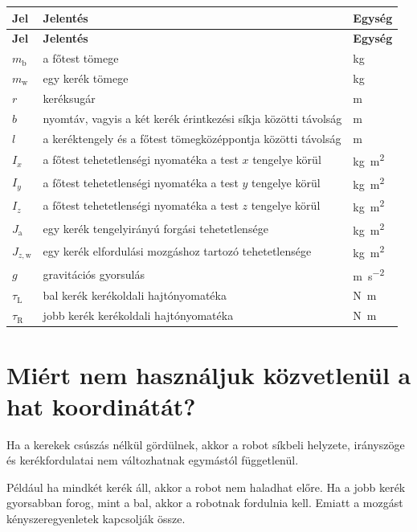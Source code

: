\documentclass[12pt,a4paper]{article}
\newcommand{\mbody}{m_{\mathrm{b}}}
\newcommand{\mwheel}{m_{\mathrm{w}}}
\newcommand{\Jspin}{J_{\mathrm{a}}}
\newcommand{\Jzw}{J_{z,\mathrm{w}}}
\newcommand{\tauL}{\tau_{\mathrm{L}}}
\newcommand{\tauR}{\tau_{\mathrm{R}}}
\begin{document}
	\begin{longtable}{>{\centering\arraybackslash}p{2.5cm} p{8cm} p{2.5cm}}
		\toprule
		\textbf{Jel} & \textbf{Jelentés} & \textbf{Egység} \\
		\midrule
		\endfirsthead
		\toprule
		\textbf{Jel} & \textbf{Jelentés} & \textbf{Egység} \\
		\midrule
		\endhead
		$\mbody$ & a főtest tömege & \si{kg} \\
		$\mwheel$ & egy kerék tömege & \si{kg} \\
		$r$ & keréksugár & \si{m} \\
		$b$ & nyomtáv, vagyis a két kerék érintkezési síkja közötti távolság & \si{m} \\
		$l$ & a keréktengely és a főtest tömegközéppontja közötti távolság & \si{m} \\
		$I_x$ & a főtest tehetetlenségi nyomatéka a test $x$ tengelye körül & \si{kg.m^2} \\
		$I_y$ & a főtest tehetetlenségi nyomatéka a test $y$ tengelye körül & \si{kg.m^2} \\
		$I_z$ & a főtest tehetetlenségi nyomatéka a test $z$ tengelye körül & \si{kg.m^2} \\
		$\Jspin$ & egy kerék tengelyirányú forgási tehetetlensége & \si{kg.m^2} \\
		$\Jzw$ & egy kerék elfordulási mozgáshoz tartozó tehetetlensége & \si{kg.m^2} \\
		$g$ & gravitációs gyorsulás & \si{m.s^{-2}} \\
		$\tauL$ & bal kerék kerékoldali hajtónyomatéka & \si{N.m} \\
		$\tauR$ & jobb kerék kerékoldali hajtónyomatéka & \si{N.m} \\
		\bottomrule
	\end{longtable}
	
	\section{Miért nem használjuk közvetlenül a hat koordinátát?}
	
	Ha a kerekek csúszás nélkül gördülnek, akkor a robot síkbeli helyzete, irányszöge és kerékfordulatai nem változhatnak egymástól függetlenül.
	
	Például ha mindkét kerék áll, akkor a robot nem haladhat előre. Ha a jobb kerék gyorsabban forog, mint a bal, akkor a robotnak fordulnia kell. Emiatt a mozgást kényszeregyenletek kapcsolják össze.
	
\end{document}
